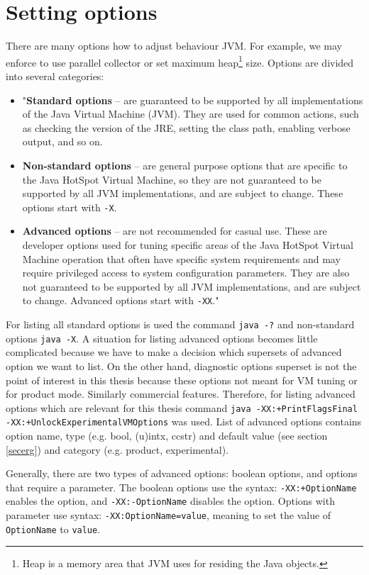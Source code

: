\documentclass[
  digital, %
  oneside,
  notable, %
  nolof,     %
  nolot     %
]{fithesis3}
\begin{document}
\section{Setting options}\label{secoptions}
There are many options how to adjust behaviour JVM. For example, we may enforce to use parallel collector or set maximum heap\footnote{Heap is a memory area that JVM uses for residing the Java objects.} size. Options are divided into several categories:
\begin{itemize}
	\item "\textbf{Standard options} -- are guaranteed to be supported by all implementations of the Java Virtual Machine (JVM). They are used for common actions, such as checking the version of the JRE, setting the class path, enabling verbose output, and so on.
	\item \textbf{Non-standard options} -- are general purpose options that are specific to the Java HotSpot Virtual Machine, so they are not guaranteed to be supported by all JVM implementations, and are subject to change. These options start with \texttt{-X}.
	\item \textbf{Advanced options} -- are not recommended for casual use. These are developer options used for tuning specific areas of the Java HotSpot Virtual Machine operation that often have specific system requirements and may require privileged access to system configuration parameters. They are also not guaranteed to be supported by all JVM implementations, and are subject to change. Advanced options start with \texttt{-XX}." \cite{java}
\end{itemize}
For listing all standard options is used the command \texttt{java -?} and non-standard options \texttt{java -X}. A situation for listing advanced options becomes little complicated because we have to make a decision which supersets of advanced option we want to list. On the other hand, diagnostic options superset is not the point of interest in this thesis because these options not meant for VM tuning or for product mode. Similarly commercial features. Therefore, for listing advanced options which are relevant for this thesis command \texttt{java -XX:+PrintFlagsFinal -XX:+UnlockExperimentalVMOptions} was used. List of advanced options contains option name, type (e.g. bool, (u)intx, ccstr) and default value (see section \ref{secerg}) and category (e.g. product, experimental).

Generally, there are two types of advanced options: boolean options, and options that require a parameter. The boolean options use the syntax: \texttt{-XX:+OptionName} enables the option, and \texttt{-XX:-OptionName} disables the option. Options with parameter use syntax: \texttt{-XX:OptionName=value}, meaning to set the value of \texttt{OptionName} to \texttt{value}. \cite{scott}
\end{document}

